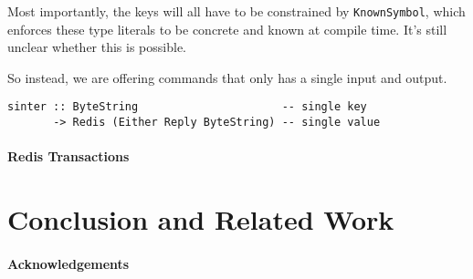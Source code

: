 \documentclass[pldi]{sigplanconf-pldi16}
\begin{document}
Most importantly, the keys will all have to be constrained by
 \texttt{KnownSymbol}, which enforces these type literals to be
 concrete and known at compile time.
 It's still unclear whether this is possible.

So instead, we are offering commands that only has a single input and output.

\begin{verbatim}
sinter :: ByteString                      -- single key
       -> Redis (Either Reply ByteString) -- single value
\end{verbatim}

\paragraph{Redis Transactions}



\section{Conclusion and Related Work}
\paragraph{Acknowledgements}




\end{document}
